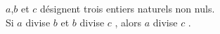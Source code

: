 
$a$,$b$ et $c$ désignent trois entiers naturels non nuls.\\

Si $a$ divise $b$ et $b$ divise $c$ , alors $a$ divise $c$ .
